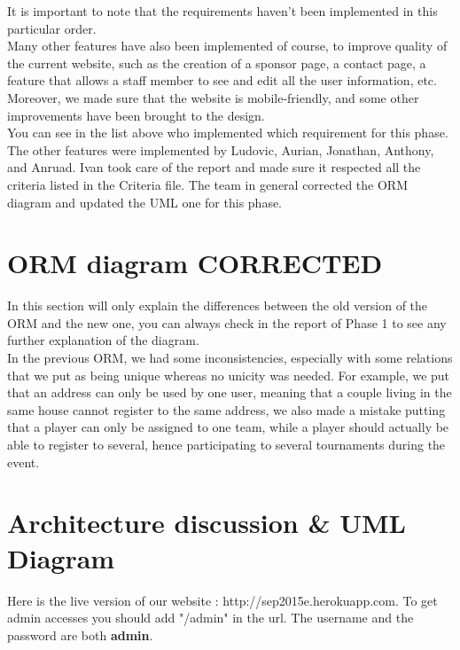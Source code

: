 \documentclass[a4paper, 12pt]{article}
\begin{document}
It is important to note that the requirements haven't been implemented in this particular order.\\

Many other features have also been implemented of course, to improve quality of the current website, such as the creation of a sponsor page, a contact page, a feature that allows a staff member to see and edit all the user information, etc. Moreover, we made sure that the website is mobile-friendly, and some other improvements have been brought to the design.\\

You can see in the list above who implemented which requirement for this phase. The other features were implemented by Ludovic, Aurian, Jonathan, Anthony, and Anruad. Ivan took care of the report and made sure it respected all the criteria listed in the Criteria file. The team in general corrected the ORM diagram and updated the UML one for this phase. \\

\section{ORM diagram CORRECTED}

In this section will only explain the differences between the old version of the ORM and the new one, you can always check in the report of Phase 1 to see any further explanation of the diagram. \\

In the previous ORM, we had some inconsistencies, especially with some relations that we put as being unique whereas no unicity was needed. For example, we put that an address can only be used by one user, meaning that a couple living in the same house cannot register to the same address, we also made a mistake putting that a player can only be assigned to one team, while a player should actually be able to register to several, hence participating to several tournaments during the event.
 

\section{Architecture discussion \& UML Diagram}

Here is the live version of our website : http://sep2015e.herokuapp.com.  To get admin accesses you should add "/admin" in the url. The username and the password are both \textbf{admin}.\\
\end{document}
